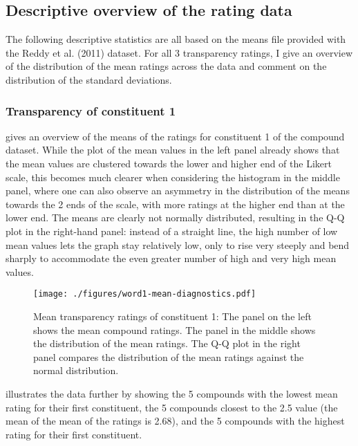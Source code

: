 \subsection{Descriptive overview of the rating data}
\label{sec:descriptive-statistics}
The following descriptive statistics are all based on the means file
provided with the Reddy et al. (2011) dataset. For all 3 transparency ratings, I give
an overview of the distribution of the mean ratings across the data
and comment on the distribution of the standard deviations. 
\subsubsection{Transparency of constituent 1}

 gives an overview of the
means of the ratings for constituent 1 of the compound dataset. While
the plot of the mean values in the left panel already shows that
the mean values are clustered towards the lower and higher end of the
Likert scale, this becomes much clearer when considering the histogram
in the middle panel, where one can also observe an asymmetry in the distribution of the means towards the 2 ends of the scale, with more ratings
at the higher end than at the lower end. The means are clearly not
normally distributed, resulting in the Q-Q plot in the right-hand
panel: instead of a straight line, the high number of low mean values
lets the graph stay relatively low, only to rise very steeply and bend
sharply to accommodate the even greater number of high and very high mean values.
\begin{figure}[!htb]
  \centering
\texttt{[image: ./figures/word1-mean-diagnostics.pdf]}
  
  \caption{Mean transparency ratings of constituent 1: The panel on
    the left shows the mean compound ratings. The panel in the middle shows the distribution of the mean ratings. The Q-Q plot in the right
    panel compares the distribution of the mean
    ratings against the normal distribution.}
  \label{fig:reddy-means-constituent-1}
\end{figure}

 illustrates the data further by
showing the 5 compounds with the lowest mean rating for their first
constituent, the 5 compounds closest to the 2.5 value (the mean of the
mean of the ratings is 2.68), and the 5 compounds with the highest
rating for their first constituent.

